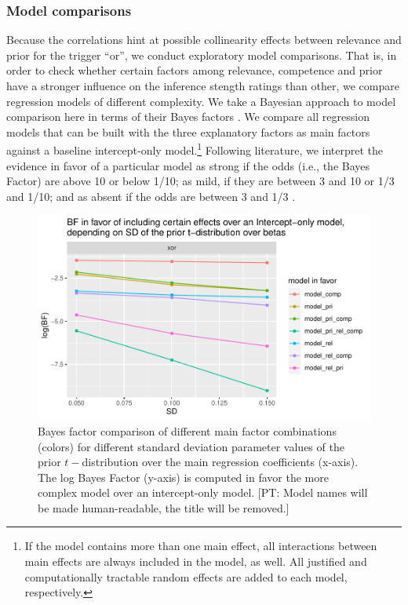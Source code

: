 \documentclass{sp}
\newcommand{\pt}[1]{\textcolor{Cerulean}{[PT: #1]}}
\begin{document}
\subsubsection{Model comparisons}
Because the correlations hint at possible collinearity effects between relevance and prior for the trigger ``or'', we conduct exploratory model comparisons. That is, in order to check whether certain factors among relevance, competence and prior have a stronger influence on the inference stength ratings than other, we compare regression models of different complexity. We take a Bayesian approach to model comparison here in terms of their Bayes factors \citep{rouder2012default}. 
We compare all regression models that can be built with the three explanatory factors as main factors against a baseline intercept-only model.\footnote{If the model contains more than one main effect, all interactions between main effects are always included in the model, as well. All justified and computationally tractable random effects are added to each model, respectively.}
Following literature, we interpret the evidence in favor of a particular model as strong if the odds (i.e., the Bayes Factor) are above 10 or below 1/10; as mild, if they are between 3 and 10 or 1/3 and 1/10; and as absent if the odds are between 3 and 1/3 \citep[e.g.,][]{lodewyckx2011tutorial}. 

\begin{figure}[h]
	\begin{center}
		\includegraphics[width=\linewidth]{images/BF_vs_SD_allModels_vs_int.pdf}
	\end{center}
	\vspace{-0.3cm}
	\caption{Bayes factor comparison of different main factor combinations (colors) for different standard deviation parameter values of the prior $t-$distribution over the main regression coefficients (x-axis). The log Bayes Factor (y-axis) is computed in favor the more complex model over an intercept-only model. \pt{Model names will be made human-readable, the title will be removed.}}
	\label{bf-grid-search}
\end{figure}
\end{document}
